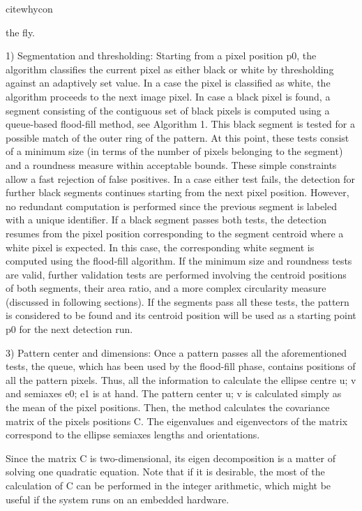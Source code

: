 \documentclass[a4paper]{report}
\begin{document}
cite{whycon}

the fly. 

 
1) Segmentation and thresholding: Starting from a pixel position p0, the algorithm classifies the current pixel as either black or white by thresholding against an adaptively set value.
In a case the pixel is classified as white, the algorithm
proceeds to the next image pixel. In case a black pixel is
found, a segment consisting of the contiguous set of black
pixels is computed using a queue-based flood-fill method, see
Algorithm 1. This black segment is tested for a possible match
of the outer ring of the pattern. At this point, these tests consist
of a minimum size (in terms of the number of pixels belonging
to the segment) and a roundness measure within acceptable
bounds. These simple constraints allow a fast rejection of false
positives. In a case either test fails, the detection for further
black segments continues starting from the next pixel position.
However, no redundant computation is performed since the
previous segment is labeled with a unique identifier.
If a black segment passes both tests, the detection resumes
from the pixel position corresponding to the segment centroid
where a white pixel is expected. In this case, the corresponding
white segment is computed using the flood-fill algorithm. If the
minimum size and roundness tests are valid, further validation
tests are performed involving the centroid positions of both
segments, their area ratio, and a more complex circularity
measure (discussed in following sections). If the segments pass
all these tests, the pattern is considered to be found and its
centroid position will be used as a starting point p0 for the
next detection run.


3) Pattern center and dimensions: Once a pattern passes all
the aforementioned tests, the queue, which has been used by
the flood-fill phase, contains positions of all the pattern pixels.
Thus, all the information to calculate the ellipse centre u; v and
semiaxes e0; e1 is at hand. The pattern center u; v is calculated
simply as the mean of the pixel positions. Then, the method
calculates the covariance matrix of the pixels positions C. The
eigenvalues and eigenvectors of the matrix correspond to the
ellipse semiaxes lengths and orientations. 

Since the matrix C is two-dimensional, its eigen decomposition
is a matter of solving one quadratic equation. Note
that if it is desirable, the most of the calculation of C can be
performed in the integer arithmetic, which might be useful if
the system runs on an embedded hardware.
\end{document}
